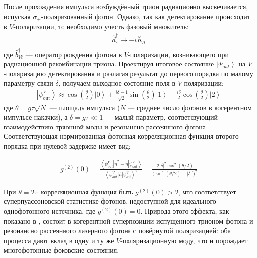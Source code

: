 \documentclass[11pt]{article}    %
\numberwithin{equation}{section}
\begin{document}
После прохождения импульса возбуждённый трион радиационно высвечивается,
испуская $\sigma_+$-поляризованный фотон. Однако, так как детектирование
происходит в $V$-поляризации, то необходимо учесть фазовый множитель:
\begin{gather}
    \hat{d}^{\dag}_{\uparrow} \to -i\, \hat{b}^{\dag}_{V t}
\end{gather}
где $\hat{b}^{\dag}_{V t}$ --- оператор рождения фотона в $V$-поляризации, возникающего при
радиационной рекомбинации триона. Проектируя итоговое состояние
$\left|\Psi_{out}\right\rangle$ на $V$-поляризацию детектирования
и разлагая результат до первого
порядка по малому параметру связи $\delta$, получаем выходное состояние
поля в $V$-поляризации:
\begin{gather}
    \left| \psi_{\text{out}}^{V} \right\rangle \approx
    \cos\!\left( \tfrac{\theta}{2} \right) \left| 0 \right\rangle
    + \frac{i\delta - 1}{\sqrt{2}} \sin\!\left( \tfrac{\theta}{2} \right) \left| 1 \right\rangle
    + \frac{i\delta}{2} \cos\!\left( \tfrac{\theta}{2} \right) \left| 2 \right\rangle
\end{gather}
где $\theta = g\tau\sqrt{N}$ --- площадь импульса ($N$ --- среднее
число фотонов в когерентном импульсе накачки), а $\delta = g\tau \ll 1$ ---
малый параметр, соответсвующий взаимодействию трионной моды и резонансно рассеянного фотона.
Соответствующая нормированная фотонная корреляционная функция второго порядка
при нулевой задержке имеет вид:

\begin{gather}
    g^{(2)}(0) =
    \frac{ \left< \psi_{out}^V \left| \hat{n}^2 - \hat{n} \right| \psi_{out}^V \right>}
    {\left< \psi_{out}^V \left| \hat{n} \right| \psi_{out}^V \right> ^2 } =
    \frac{2\left|\delta\right|^2 \cos^2\!\left(\theta/2\right)}
    {\bigl(\sin^2\!\left(\theta/2\right) + \left|\delta\right|^2\bigr)^2}
\end{gather}

При $\theta = 2\pi$ корреляционная функция быть $g^{(2)}(0) > 2$,
что соответствует суперпуассоновской статистике фотонов,
недоступной для идеального однофотонного
источника, где $g^{(2)}(0) = 0$. Природа этого эффекта,
как показано в \cite{krainov2025}, состоит в когерентной суперпозиции
испущенного трионом фотона и резонансно рассеянного лазерного фотона
с повёрнутой поляризацией: оба процесса дают вклад в одну и ту же
$V$-поляризационную моду, что и порождает многофотонные фоковские состояния.
\end{document}
